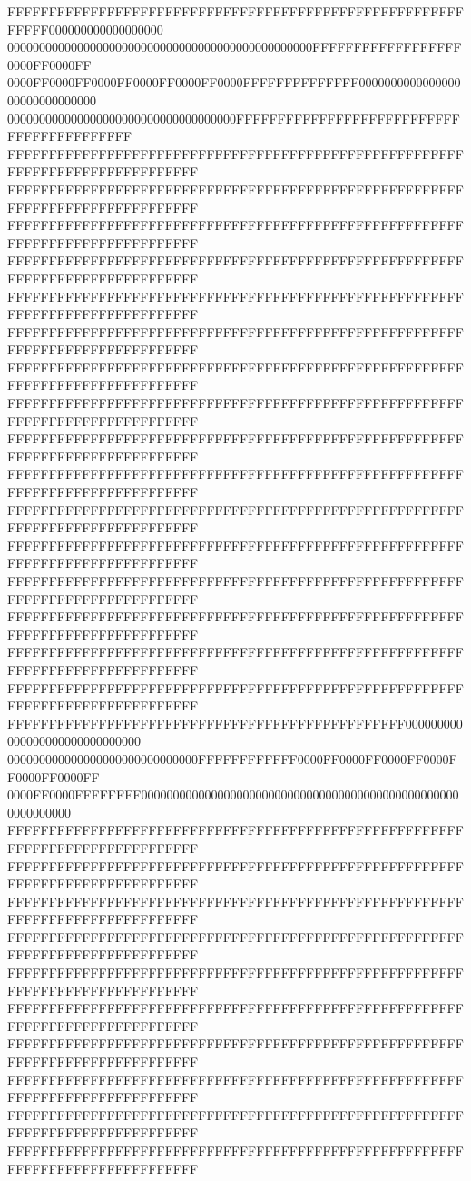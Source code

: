 FFFFFFFFFFFFFFFFFFFFFFFFFFFFFFFFFFFFFFFFFFFFFFFFFFFFFFFFFFFF000000000000000000
000000000000000000000000000000000000000000000000FFFFFFFFFFFFFFFFFF0000FF0000FF
0000FF0000FF0000FF0000FF0000FF0000FFFFFFFFFFFFFF000000000000000000000000000000
000000000000000000000000000000000000FFFFFFFFFFFFFFFFFFFFFFFFFFFFFFFFFFFFFFFFFF
FFFFFFFFFFFFFFFFFFFFFFFFFFFFFFFFFFFFFFFFFFFFFFFFFFFFFFFFFFFFFFFFFFFFFFFFFFFFFF
FFFFFFFFFFFFFFFFFFFFFFFFFFFFFFFFFFFFFFFFFFFFFFFFFFFFFFFFFFFFFFFFFFFFFFFFFFFFFF
FFFFFFFFFFFFFFFFFFFFFFFFFFFFFFFFFFFFFFFFFFFFFFFFFFFFFFFFFFFFFFFFFFFFFFFFFFFFFF
FFFFFFFFFFFFFFFFFFFFFFFFFFFFFFFFFFFFFFFFFFFFFFFFFFFFFFFFFFFFFFFFFFFFFFFFFFFFFF
FFFFFFFFFFFFFFFFFFFFFFFFFFFFFFFFFFFFFFFFFFFFFFFFFFFFFFFFFFFFFFFFFFFFFFFFFFFFFF
FFFFFFFFFFFFFFFFFFFFFFFFFFFFFFFFFFFFFFFFFFFFFFFFFFFFFFFFFFFFFFFFFFFFFFFFFFFFFF
FFFFFFFFFFFFFFFFFFFFFFFFFFFFFFFFFFFFFFFFFFFFFFFFFFFFFFFFFFFFFFFFFFFFFFFFFFFFFF
FFFFFFFFFFFFFFFFFFFFFFFFFFFFFFFFFFFFFFFFFFFFFFFFFFFFFFFFFFFFFFFFFFFFFFFFFFFFFF
FFFFFFFFFFFFFFFFFFFFFFFFFFFFFFFFFFFFFFFFFFFFFFFFFFFFFFFFFFFFFFFFFFFFFFFFFFFFFF
FFFFFFFFFFFFFFFFFFFFFFFFFFFFFFFFFFFFFFFFFFFFFFFFFFFFFFFFFFFFFFFFFFFFFFFFFFFFFF
FFFFFFFFFFFFFFFFFFFFFFFFFFFFFFFFFFFFFFFFFFFFFFFFFFFFFFFFFFFFFFFFFFFFFFFFFFFFFF
FFFFFFFFFFFFFFFFFFFFFFFFFFFFFFFFFFFFFFFFFFFFFFFFFFFFFFFFFFFFFFFFFFFFFFFFFFFFFF
FFFFFFFFFFFFFFFFFFFFFFFFFFFFFFFFFFFFFFFFFFFFFFFFFFFFFFFFFFFFFFFFFFFFFFFFFFFFFF
FFFFFFFFFFFFFFFFFFFFFFFFFFFFFFFFFFFFFFFFFFFFFFFFFFFFFFFFFFFFFFFFFFFFFFFFFFFFFF
FFFFFFFFFFFFFFFFFFFFFFFFFFFFFFFFFFFFFFFFFFFFFFFFFFFFFFFFFFFFFFFFFFFFFFFFFFFFFF
FFFFFFFFFFFFFFFFFFFFFFFFFFFFFFFFFFFFFFFFFFFFFFFFFFFFFFFFFFFFFFFFFFFFFFFFFFFFFF
FFFFFFFFFFFFFFFFFFFFFFFFFFFFFFFFFFFFFFFFFFFFFFFF000000000000000000000000000000
000000000000000000000000000000FFFFFFFFFFFF0000FF0000FF0000FF0000FF0000FF0000FF
0000FF0000FFFFFFFF000000000000000000000000000000000000000000000000000000000000
FFFFFFFFFFFFFFFFFFFFFFFFFFFFFFFFFFFFFFFFFFFFFFFFFFFFFFFFFFFFFFFFFFFFFFFFFFFFFF
FFFFFFFFFFFFFFFFFFFFFFFFFFFFFFFFFFFFFFFFFFFFFFFFFFFFFFFFFFFFFFFFFFFFFFFFFFFFFF
FFFFFFFFFFFFFFFFFFFFFFFFFFFFFFFFFFFFFFFFFFFFFFFFFFFFFFFFFFFFFFFFFFFFFFFFFFFFFF
FFFFFFFFFFFFFFFFFFFFFFFFFFFFFFFFFFFFFFFFFFFFFFFFFFFFFFFFFFFFFFFFFFFFFFFFFFFFFF
FFFFFFFFFFFFFFFFFFFFFFFFFFFFFFFFFFFFFFFFFFFFFFFFFFFFFFFFFFFFFFFFFFFFFFFFFFFFFF
FFFFFFFFFFFFFFFFFFFFFFFFFFFFFFFFFFFFFFFFFFFFFFFFFFFFFFFFFFFFFFFFFFFFFFFFFFFFFF
FFFFFFFFFFFFFFFFFFFFFFFFFFFFFFFFFFFFFFFFFFFFFFFFFFFFFFFFFFFFFFFFFFFFFFFFFFFFFF
FFFFFFFFFFFFFFFFFFFFFFFFFFFFFFFFFFFFFFFFFFFFFFFFFFFFFFFFFFFFFFFFFFFFFFFFFFFFFF
FFFFFFFFFFFFFFFFFFFFFFFFFFFFFFFFFFFFFFFFFFFFFFFFFFFFFFFFFFFFFFFFFFFFFFFFFFFFFF
FFFFFFFFFFFFFFFFFFFFFFFFFFFFFFFFFFFFFFFFFFFFFFFFFFFFFFFFFFFFFFFFFFFFFFFFFFFFFF

